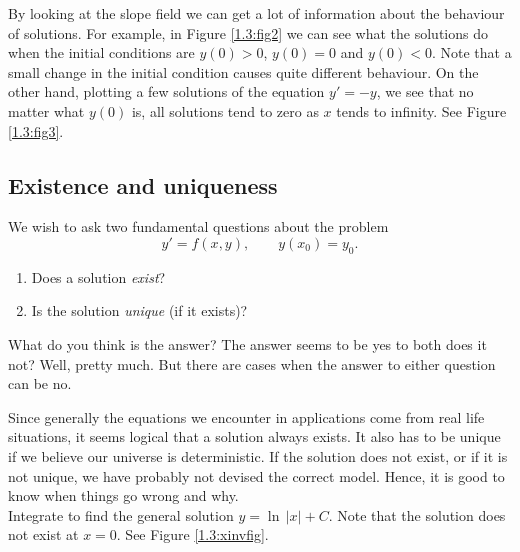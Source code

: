 By looking at the slope field we can get a lot of information
about the behaviour of
solutions.  For
example, in Figure \ref{1.3:fig2} we can see what the solutions do when the initial conditions
are $y(0) > 0$, $y(0) = 0$ and $y(0) < 0$.  Note that a small change in the
initial condition causes quite different behaviour.
On the other hand, plotting a few solutions of the equation
$y' = -y$,
we see that no matter what $y(0)$ is, all solutions tend to zero as $x$
tends to infinity.
See Figure \ref{1.3:fig3}.


\subsection*{Existence and uniqueness}

We wish to ask two fundamental questions about the problem
\begin{equation*}
y' = f(x,y), \qquad y(x_0) = y_0.
\end{equation*}
\begin{enumerate}[label=(\roman*)]
\item Does a solution \emph{exist}?
\item Is the solution \emph{unique} (if it exists)?
\end{enumerate}

What do you think is the answer?
The answer seems to be yes to both does it not?  Well, pretty much.  But there
are cases when the answer to either question can be no.

Since generally the equations we encounter in applications
come from real life situations, it seems
logical that a solution always exists.
It also has to be unique if we believe our
universe is deterministic.  If the solution does not exist, or if it is
not unique, we have
probably not devised the correct model.  Hence, it is good to know
when things go wrong and why.\\

{
Integrate to find the general solution $y = \ln \, \lvert x \rvert + C$.  Note that the
solution does not exist at $x=0$.  See Figure \ref{1.3:xinvfig}.
}\\


